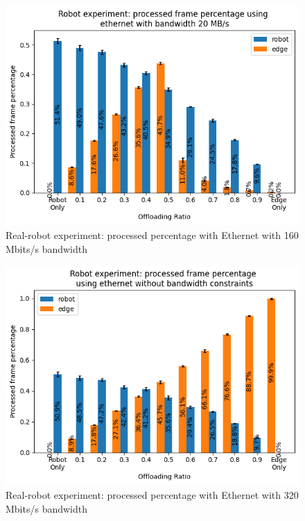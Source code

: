 \begin{figure}
    \centering
    \includegraphics[width=\linewidth]{figures/experiment/real_robot/eth/frame_percentage_160.png}
    \caption{Real-robot experiment: processed percentage with Ethernet with 160 Mbits/s bandwidth}
    \label{fig:real_robot_experiment:eth_processed_frame_percentage_160}
\end{figure}

\begin{figure}
    \centering
    \includegraphics[width=\linewidth]{figures/experiment/real_robot/eth/frame_percentage_320.png}
    \caption{Real-robot experiment: processed percentage with Ethernet with 320 Mbits/s bandwidth}
    \label{fig:real_robot_experiment:eth_processed_frame_percentage_320}
\end{figure}

